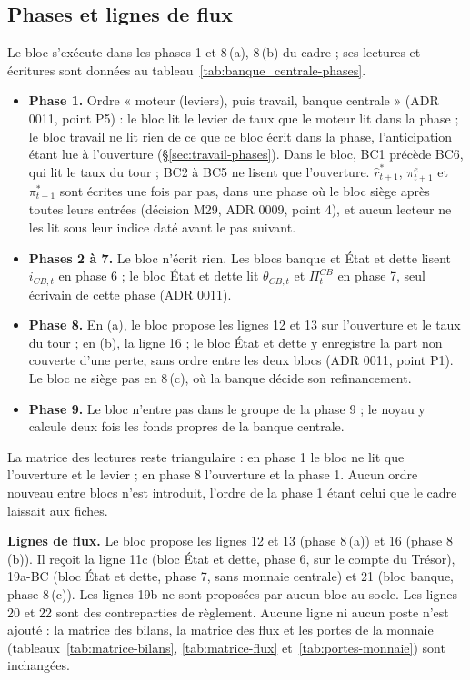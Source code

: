 \documentclass[11pt,a4paper]{article}
\begin{document}
\subsection{Phases et lignes de flux}
\label{sec:banque_centrale-phases}
\begin{proposee}
Le bloc s'exécute dans les phases 1 et 8\,(a), 8\,(b) du cadre ; ses lectures et écritures sont données au tableau~\ref{tab:banque_centrale-phases}.
\begin{itemize}
\item \textbf{Phase 1.} Ordre « moteur (leviers), puis travail, banque centrale » (ADR 0011, point P5) : le bloc lit le levier de taux que le moteur lit dans la phase ; le bloc travail ne lit rien de ce que ce bloc écrit dans la phase, l'anticipation étant lue à l'ouverture (\S\ref{sec:travail-phases}). Dans le bloc, BC1 précède BC6, qui lit le taux du tour ; BC2 à BC5 ne lisent que l'ouverture. $\hat r^\ast_{t+1}$, $\pi^e_{t+1}$ et $\pi^\ast_{t+1}$ sont écrites une fois par pas, dans une phase où le bloc siège après toutes leurs entrées (décision M29, ADR 0009, point 4), et aucun lecteur ne les lit sous leur indice daté avant le pas suivant.
\item \textbf{Phases 2 à 7.} Le bloc n'écrit rien. Les blocs banque et État et dette lisent $i_{\mathit{CB},t}$ en phase 6 ; le bloc État et dette lit $\theta_{\mathit{CB},t}$ et $\Pi^{\mathit{CB}}_t$ en phase 7, seul écrivain de cette phase (ADR 0011).
\item \textbf{Phase 8.} En (a), le bloc propose les lignes 12 et 13 sur l'ouverture et le taux du tour ; en (b), la ligne 16 ; le bloc État et dette y enregistre la part non couverte d'une perte, sans ordre entre les deux blocs (ADR 0011, point P1). Le bloc ne siège pas en 8\,(c), où la banque décide son refinancement.
\item \textbf{Phase 9.} Le bloc n'entre pas dans le groupe de la phase 9 ; le noyau y calcule deux fois les fonds propres de la banque centrale.
\end{itemize}
La matrice des lectures reste triangulaire : en phase 1 le bloc ne lit que l'ouverture et le levier ; en phase 8 l'ouverture et la phase 1. Aucun ordre nouveau entre blocs n'est introduit, l'ordre de la phase 1 étant celui que le cadre laissait aux fiches.

\textbf{Lignes de flux.} Le bloc propose les lignes 12 et 13 (phase 8\,(a)) et 16 (phase 8\,(b)). Il reçoit la ligne 11c (bloc État et dette, phase 6, sur le compte du Trésor), 19a-BC (bloc État et dette, phase 7, sans monnaie centrale) et 21 (bloc banque, phase 8\,(c)). Les lignes 19b ne sont proposées par aucun bloc au socle. Les lignes 20 et 22 sont des contreparties de règlement. Aucune ligne ni aucun poste n'est ajouté : la matrice des bilans, la matrice des flux et les portes de la monnaie (tableaux~\ref{tab:matrice-bilans}, \ref{tab:matrice-flux} et~\ref{tab:portes-monnaie}) sont inchangées.


\end{proposee}
\end{document}
